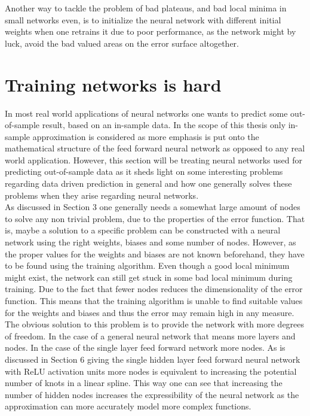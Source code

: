 \documentclass[11pt, letterpaper]{amsart}
\begin{document}
Another way to tackle the problem of bad plateaus, and bad local minima in small networks even, is to initialize the neural network with different initial weights when one retrains it due to poor performance, as the network might by luck, avoid the bad valued areas on the error surface altogether.

\section{Training networks is hard}
In most real world applications of neural networks one wants to predict some out-of-sample result, based on an in-sample data. In the scope of this thesis only in-sample approximation is considered as more emphasis is put onto the mathematical structure of the feed forward neural network as opposed to any real world application. However, this section will be treating neural networks used for predicting out-of-sample data as it sheds light on some interesting problems regarding data driven prediction in general and how one generally solves these problems when they arise regarding neural networks.
\\

As discussed in Section 3 one generally needs a somewhat large amount of nodes to solve any non trivial problem, due to the properties of the error function. That is, maybe a solution to a specific problem can be constructed with a neural network using the right weights, biases and some number of nodes. However, as the proper values for the weights and biases are not known beforehand, they have to be found using the training algorithm. Even though a good local minimum might exist, the network can still get stuck in some bad local minimum during training. Due to the fact that fewer nodes reduces the dimensionality of the error function. This means that the training algorithm is unable to find suitable values for the weights and biases and thus the error may remain high in any measure.
\\

The obvious solution to this problem is to provide the network with more degrees of freedom. In the case of a general neural network that means more layers and nodes. In the case of the single layer feed forward network more nodes. As is discussed in Section 6 giving the single hidden layer feed forward neural network with ReLU activation units more nodes is equivalent to increasing the potential number of knots in a linear spline. This way one can see that increasing the number of hidden nodes increases the expressibility of the neural network as the approximation can more accurately model more complex functions.
\\
\end{document}

